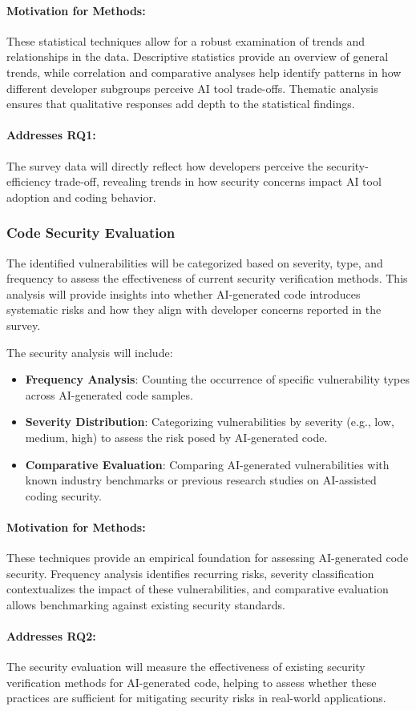 \paragraph{Motivation for Methods:} These statistical techniques allow for a robust examination of trends and relationships in the data. Descriptive statistics provide an overview of general trends, while correlation and comparative analyses help identify patterns in how different developer subgroups perceive AI tool trade-offs. Thematic analysis ensures that qualitative responses add depth to the statistical findings.

\paragraph{Addresses RQ1:} The survey data will directly reflect how developers perceive the security-efficiency trade-off, revealing trends in how security concerns impact AI tool adoption and coding behavior.

\subsubsection{Code Security Evaluation}

The identified vulnerabilities will be categorized based on severity, type, and frequency to assess the effectiveness of current security verification methods. This analysis will provide insights into whether AI-generated code introduces systematic risks and how they align with developer concerns reported in the survey.

The security analysis will include:

\begin{itemize}
    \item \textbf{Frequency Analysis}: Counting the occurrence of specific vulnerability types across AI-generated code samples.
    \item \textbf{Severity Distribution}: Categorizing vulnerabilities by severity (e.g., low, medium, high) to assess the risk posed by AI-generated code.
    \item \textbf{Comparative Evaluation}: Comparing AI-generated vulnerabilities with known industry benchmarks or previous research studies on AI-assisted coding security.
\end{itemize}

\paragraph{Motivation for Methods:} These techniques provide an empirical foundation for assessing AI-generated code security. Frequency analysis identifies recurring risks, severity classification contextualizes the impact of these vulnerabilities, and comparative evaluation allows benchmarking against existing security standards.

\paragraph{Addresses RQ2:} The security evaluation will measure the effectiveness of existing security verification methods for AI-generated code, helping to assess whether these practices are sufficient for mitigating security risks in real-world applications.

